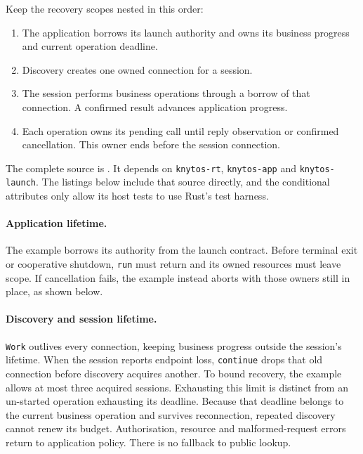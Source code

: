 \begin{samepage}
Keep the recovery scopes nested in this order:

\begin{enumerate}
    \item The application borrows its launch authority and owns its business
        progress and current operation deadline.
    \item Discovery creates one owned connection for a session.
    \item The session performs business operations through a borrow of that
        connection. A confirmed result advances application progress.
    \item Each operation owns its pending call until reply observation or
        confirmed cancellation. This owner ends before the session connection.
\end{enumerate}
\end{samepage}

The complete source is
. It depends on
\texttt{knytos-rt}, \texttt{knytos-app} and
\texttt{knytos-launch}. The listings below include that source directly, and
the conditional attributes only allow its host tests to use Rust's test harness.

\paragraph*{Application lifetime.}
The example borrows its authority from the launch contract. Before terminal exit
or cooperative shutdown, \texttt{run} must return and its owned resources must
leave scope. If cancellation fails, the example instead aborts with those
owners still in place, as shown below.



\paragraph*{Discovery and session lifetime.}
\texttt{Work} outlives every connection, keeping business progress outside the
session's lifetime. When the session reports endpoint loss,
\texttt{continue} drops that old connection before discovery acquires another.
To bound recovery, the example allows at most three acquired sessions. Exhausting
this limit is distinct from an un-started operation exhausting its deadline.
Because that deadline belongs to the current business operation and survives
reconnection, repeated discovery cannot renew its budget.
Authorisation, resource and malformed-request errors return to application policy.
There is no fallback to public lookup.

